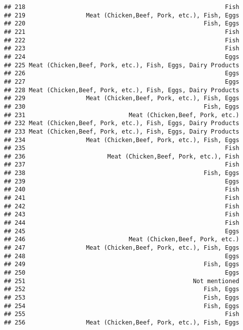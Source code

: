\documentclass[
]{article}
\begin{document}
\begin{verbatim}
## 218                                                        Fish
## 219                 Meat (Chicken,Beef, Pork, etc.), Fish, Eggs
## 220                                                  Fish, Eggs
## 221                                                        Fish
## 222                                                        Fish
## 223                                                        Fish
## 224                                                        Eggs
## 225 Meat (Chicken,Beef, Pork, etc.), Fish, Eggs, Dairy Products
## 226                                                        Eggs
## 227                                                        Eggs
## 228 Meat (Chicken,Beef, Pork, etc.), Fish, Eggs, Dairy Products
## 229                 Meat (Chicken,Beef, Pork, etc.), Fish, Eggs
## 230                                                  Fish, Eggs
## 231                             Meat (Chicken,Beef, Pork, etc.)
## 232 Meat (Chicken,Beef, Pork, etc.), Fish, Eggs, Dairy Products
## 233 Meat (Chicken,Beef, Pork, etc.), Fish, Eggs, Dairy Products
## 234                 Meat (Chicken,Beef, Pork, etc.), Fish, Eggs
## 235                                                        Fish
## 236                       Meat (Chicken,Beef, Pork, etc.), Fish
## 237                                                        Fish
## 238                                                  Fish, Eggs
## 239                                                        Eggs
## 240                                                        Fish
## 241                                                        Fish
## 242                                                        Fish
## 243                                                        Fish
## 244                                                        Fish
## 245                                                        Eggs
## 246                             Meat (Chicken,Beef, Pork, etc.)
## 247                 Meat (Chicken,Beef, Pork, etc.), Fish, Eggs
## 248                                                        Eggs
## 249                                                  Fish, Eggs
## 250                                                        Eggs
## 251                                               Not mentioned
## 252                                                  Fish, Eggs
## 253                                                  Fish, Eggs
## 254                                                  Fish, Eggs
## 255                                                        Fish
## 256                 Meat (Chicken,Beef, Pork, etc.), Fish, Eggs

\end{verbatim}
\end{document}
